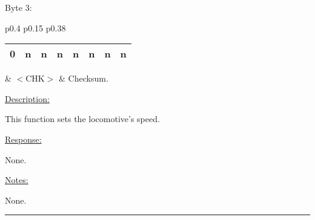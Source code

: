 Byte 3:

\begin{tabular}{p{0.4\linewidth} p{0.15\linewidth} p{0.38\linewidth}} 

\begin{tabular}{|p{0.3cm}|p{0.3cm}|p{0.3cm}|p{0.3cm}|p{0.3cm}|p{0.3cm}|p{0.3cm}|p{0.3cm}|}
\hline
0 & n & n & n & n & n & n & n\\
\hline
\end{tabular}
& $<$CHK$>$ & Checksum.
\end{tabular}

\underline{Description:}

This function sets the locomotive's speed.

\underline{Response:} 

None.

\underline{Notes:} 

None.

\rule{15.1cm}{0.4pt}
